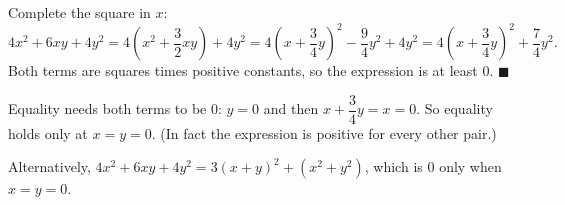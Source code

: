 Complete the square in $x$:
\[
4x^2+6xy+4y^2=4\left(x^2+\dfrac{3}{2}xy\right)+4y^2=4\left(x+\dfrac{3}{4}y\right)^2-\dfrac{9}{4}y^2+4y^2=4\left(x+\dfrac{3}{4}y\right)^2+\dfrac{7}{4}y^2 .
\]
Both terms are squares times positive constants, so the expression is at least $0$. $\blacksquare$

Equality needs both terms to be $0$: $y=0$ and then $x+\dfrac{3}{4}y=x=0$. So equality holds only at $\boxed{x=y=0}$. (In fact the expression is positive for every other pair.)

Alternatively, $4x^2+6xy+4y^2=3(x+y)^2+(x^2+y^2)$, which is $0$ only when $x=y=0$.
